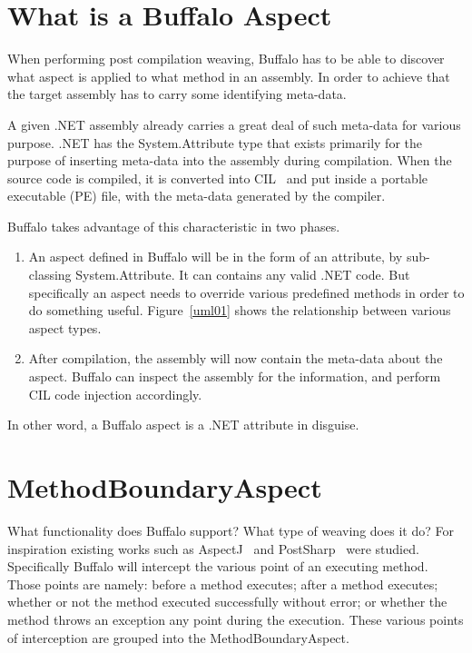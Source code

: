 \section{What is a Buffalo Aspect}

When performing post compilation weaving, Buffalo has to be able to discover what aspect is applied to what method in an assembly. In order to achieve that the target assembly has to carry some identifying meta-data.

A given .NET assembly already carries a great deal of such meta-data for various purpose. .NET has the System.Attribute type that exists primarily for the purpose of inserting meta-data into the assembly during compilation. When the source code is compiled, it is converted into CIL~\cite{msil_text} and put inside a portable executable (PE) file, with the meta-data generated by the compiler. 

Buffalo takes advantage of this characteristic in two phases.
\begin{enumerate}
	\item An aspect defined in Buffalo will be in the form of an attribute, by sub-classing System.Attribute. It can contains any valid .NET code. But specifically an aspect needs to override various predefined methods in order to do something useful. Figure~\ref{uml01} shows the relationship between various aspect types.
	\item After compilation, the assembly will now contain the meta-data about the aspect. Buffalo can inspect the assembly for the information, and perform CIL code injection accordingly.
\end{enumerate}

In other word, a Buffalo aspect is a .NET attribute in disguise.

\section{MethodBoundaryAspect}
What functionality does Buffalo support? What type of weaving does it do? For inspiration existing works such as AspectJ~\cite{aspectj_faq} and PostSharp~\cite{postsharp} were studied. Specifically Buffalo will intercept the various point of an executing method. Those points are namely: before a method executes; after a method executes; whether or not the method executed successfully without error; or whether the method throws an exception any point during the execution. These various points of interception are grouped into the MethodBoundaryAspect.

